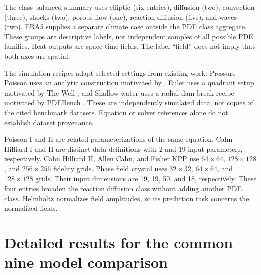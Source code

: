 \begin{table}[h!]
\centering\footnotesize\setlength{\tabcolsep}{3pt}
\caption{Inventory of the 22 datasets in this paper. Query cases are later partitioned into fitting pools and evaluation
sets. They are not all final test cases in every reported mixture experiment. Citations identify
imported data. Uncited rows use our simulation code, with recipe influences
distinguished from data sources below.}
\label{tab:roster}\resizebox{\linewidth}{!}{}
\end{table}

The class balanced summary uses elliptic (six entries), diffusion (two),
convection (three), shocks (two), porous flow (one), reaction diffusion (five), and waves (two).
ERA5 supplies a
separate climate case outside the PDE class aggregate. These groups are descriptive labels, not independent
samples of all possible PDE families. Heat outputs are space time fields. The label
``field'' does not imply that both axes are spatial.

The simulation recipes adapt selected settings from existing work: Pressure Poisson
uses an analytic construction motivated by \citet{partin2022}, Euler uses a
quadrant setup motivated by The Well \citep{ohana2024}, and Shallow water uses a
radial dam break recipe motivated by PDEBench \citep{takamoto2022}. These are independently
simulated data, not copies of the cited benchmark datasets. Equation or solver
references alone do not establish dataset provenance.

Poisson I and II are related parameterizations of the same equation.
Cahn Hilliard I and II are distinct data definitions with 2 and 19 input
parameters, respectively. Cahn Hilliard II, Allen Cahn, and Fisher KPP use
$64\times64$, $128\times128$, and $256\times256$ fidelity grids. Phase field
crystal uses $32\times32$, $64\times64$, and $128\times128$ grids. Their input
dimensions are 19, 19, 50, and 18, respectively. These four entries broaden the
reaction diffusion class without adding another PDE class.
Helmholtz normalizes field amplitudes, so its prediction task concerns the
normalized fields.

\section{Detailed results for the common nine model comparison}
\label{app:allresults}
\begin{table}[h!]
\centering\footnotesize\setlength{\tabcolsep}{3.3pt}
\caption{All 21 PDE datasets at $K=5$, averaged over three partitions. Errors are relative $L^2$ percentages.
Change is the percentage change of the fitted mixture relative to the selected model. Negative favors
the fitted mixture. A dagger marks the three entries excluded only in the separate audit sensitivity. Imported Poisson II, Heat II, and Navier Stokes fields are from \citet{niu2024}.}
\label{tab:perdataset}
\end{table}

